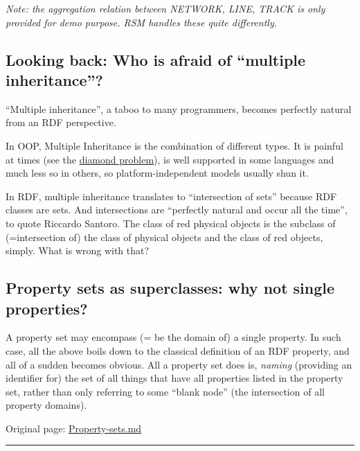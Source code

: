 \documentclass[
  11pt,
]{article}
\begin{document}
\emph{Note: the aggregation relation between NETWORK, LINE, TRACK is
only provided for demo purpose. RSM handles these quite differently.}

\hypertarget{looking-back-who-is-afraid-of-multiple-inheritance}{%
\subsection{Looking back: Who is afraid of ``multiple
inheritance''?}\label{looking-back-who-is-afraid-of-multiple-inheritance}}

``Multiple inheritance'', a taboo to many programmers, becomes perfectly
natural from an RDF perspective.

In OOP, Multiple Inheritance is the combination of different types. It
is painful at times (see the
\href{https://en.wikipedia.org/wiki/Multiple_inheritance}{diamond
problem}), is well supported in some languages and much less so in
others, so platform-independent models usually shun it.

In RDF, multiple inheritance translates to ``intersection of sets''
because RDF classes are sets. And intersections are ``perfectly natural
and occur all the time'', to quote Riccardo Santoro. The class of red
physical objects is the subclass of (=intersection of) the class of
physical objects and the class of red objects, simply. What is wrong
with that?

\hypertarget{property-sets-as-superclasses-why-not-single-properties}{%
\subsection{Property sets as superclasses: why not single
properties?}\label{property-sets-as-superclasses-why-not-single-properties}}

A property set may encompass (= be the domain of) a single property. In
such case, all the above boils down to the classical definition of an
RDF property, and all of a sudden becomes obvious. All a property set
does is, \emph{naming} (providing an identifier for) the set of all
things that have all properties listed in the property set, rather than
only referring to some ``blank node'' (the intersection of all property
domains).

Original page:
\href{https://github.com/UICrail/CDM-RSM/wiki/Property-sets}{Property-sets.md}

\begin{center}\rule{0.5\linewidth}{0.5pt}\end{center}
\end{document}
